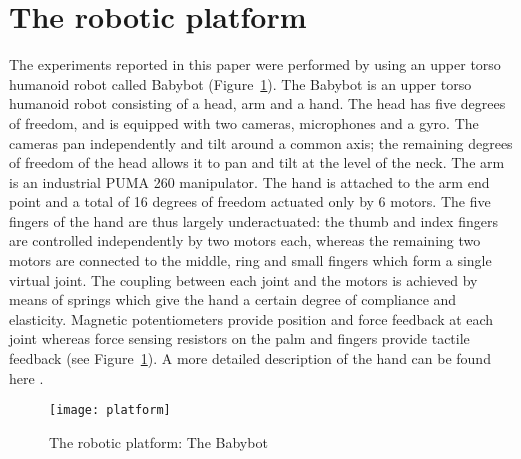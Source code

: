 \section{The robotic platform}
\label{sec-platform}
The experiments reported in this paper were performed by using an upper torso humanoid robot called Babybot (Figure~\ref{fig-platform}). The Babybot is an upper torso humanoid robot consisting of a head, arm and a hand. The head has five degrees of freedom, and is equipped with two cameras, microphones and a gyro. The cameras pan independently and tilt around a common axis; the remaining degrees of freedom of the head allows it to pan and tilt at the level of the neck. The arm is an industrial PUMA 260 manipulator. The hand is attached to the arm end point and a total of 16 degrees of freedom actuated only by 6 motors. The five fingers of the hand are thus largely underactuated: the thumb and index fingers are controlled independently by two motors each, whereas the remaining two motors are connected to the middle, ring and small fingers which form a single virtual joint. The coupling between each joint and the motors is achieved by means of springs which give the hand a certain degree of compliance and elasticity. Magnetic potentiometers provide position and force feedback at each joint whereas force sensing resistors on the palm and fingers provide tactile feedback (see Figure~\ref{fig-platform}). A more detailed description of the hand can be found here \cite{natale04thesis}.

\begin{figure}
\centering
\texttt{[image: platform]}
\caption{The robotic platform: The Babybot}
\label{fig-platform}
\end{figure}
